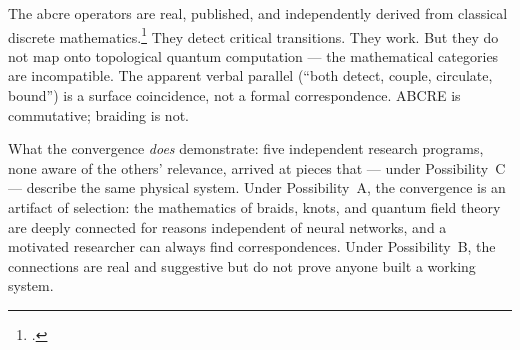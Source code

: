 The \gls{abcre} operators are real, published, and independently derived from classical discrete mathematics.\footcite{stephenson2025} They detect critical transitions. They work. But they do not map onto topological quantum computation --- the mathematical categories are incompatible. The apparent verbal parallel (``both detect, couple, circulate, bound'') is a surface coincidence, not a formal correspondence. ABCRE is commutative; braiding is not.

What the convergence \textit{does} demonstrate: five independent research programs, none aware of the others' relevance, arrived at pieces that --- under Possibility~C --- describe the same physical system. Under Possibility~A, the convergence is an artifact of selection: the mathematics of braids, knots, and quantum field theory are deeply connected for reasons independent of neural networks, and a motivated researcher can always find correspondences. Under Possibility~B, the connections are real and suggestive but do not prove anyone built a working system.

\chapterreturn
